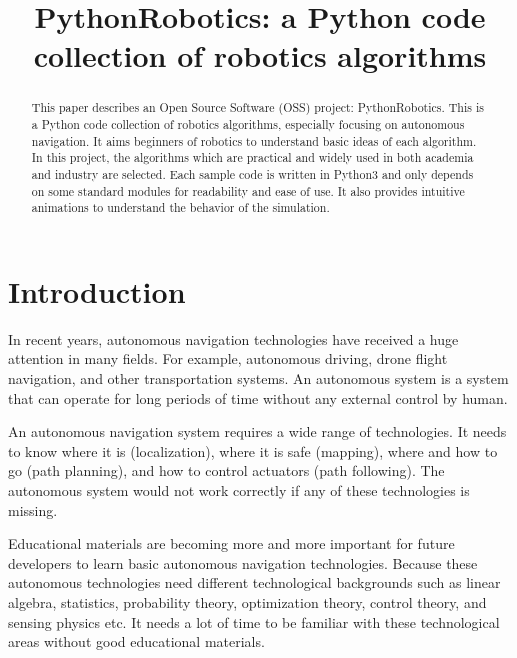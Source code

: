 \documentclass{bmvc2k}
\title{PythonRobotics: a Python code collection of robotics algorithms}
\begin{document}
\maketitle

\begin{abstract}
This paper describes an Open Source Software (OSS) project: PythonRobotics\cite{github}.
This is a Python code collection of robotics algorithms, especially focusing on autonomous navigation.
It aims beginners of robotics to understand basic ideas of each algorithm.
In this project, the algorithms which are practical and widely used in both academia and industry are selected.
Each sample code is written in Python3 and only depends on some standard modules for readability and ease of use.
It also provides intuitive animations to understand the behavior of the simulation.

\end{abstract}

\section{Introduction}

In recent years, autonomous navigation technologies have received a huge attention in many fields. 
For example, autonomous driving\cite{pathplanning}, drone flight navigation, and other transportation systems.
An autonomous system is a system that can operate for long periods of time without any external control by human.

An autonomous navigation system requires a wide range of technologies.
It needs to know where it is (localization), where it is safe (mapping), where and how to go (path planning), and how to control actuators (path following). 
The autonomous system would not work correctly if any of these technologies is missing.

Educational materials are becoming more and more important for future developers to learn basic autonomous navigation technologies.
Because these autonomous technologies need different technological backgrounds such as linear algebra, statistics, probability theory, optimization theory, control theory, and sensing physics etc. 
It needs a lot of time to be familiar with these technological areas without good educational materials.
\end{document}
